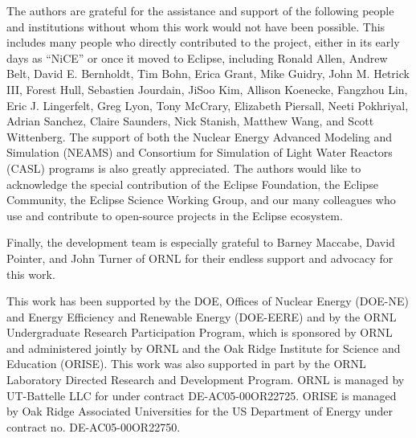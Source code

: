 The authors are grateful for the assistance and support of the following
people and institutions without whom this work would not have been
possible. This includes many people who directly contributed to the
project, either in its early days as ``NiCE'' or once it moved to
Eclipse, including Ronald Allen, Andrew Belt, David E.
Bernholdt, Tim Bohn, Erica Grant, Mike Guidry, John M. Hetrick III, Forest Hull, 
Sebastien Jourdain, JiSoo Kim, Allison Koenecke, Fangzhou Lin, Eric J. Lingerfelt, Greg
Lyon, Tony McCrary, Elizabeth Piersall, Neeti
Pokhriyal, Adrian Sanchez, Claire Saunders, Nick Stanish, Matthew Wang, and
Scott Wittenberg. The support of both the Nuclear Energy Advanced Modeling and
Simulation (NEAMS) and Consortium for Simulation of Light Water Reactors (CASL)
programs is also greatly appreciated. The authors would like to acknowledge the
special contribution of the Eclipse Foundation, the Eclipse Community, the
Eclipse Science Working Group, and our many colleagues who use and contribute
to open-source projects in the Eclipse ecosystem.

Finally, the development team is especially grateful to Barney Maccabe,
David Pointer, and John Turner of ORNL for their
endless support and advocacy for this work.

This work has been supported by the DOE, Offices of
Nuclear Energy (DOE-NE) and Energy Efficiency and Renewable Energy
(DOE-EERE) and by the ORNL Undergraduate Research Participation
Program, which is sponsored by ORNL and administered jointly by ORNL and
the Oak Ridge Institute for Science and Education (ORISE). This work was
also supported in part by the ORNL Laboratory Directed
Research and Development Program. ORNL is managed by UT-Battelle LLC for under
contract DE-AC05-00OR22725. ORISE is managed by Oak Ridge Associated
Universities for the US Department of Energy under contract no.
DE-AC05-00OR22750.
